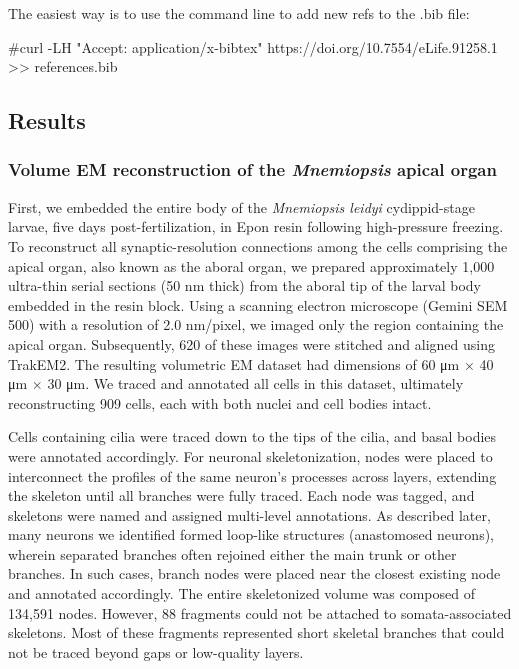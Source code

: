 \documentclass[
  11pt,
]{article}
\newenvironment{Shaded}{\begin{snugshade}}{\end{snugshade}}
\newcommand{\CommentTok}[1]{\textcolor[rgb]{0.37,0.37,0.37}{#1}}
\begin{document}
The easiest way is to use the command line to add new refs to the .bib
file:

\begin{Shaded}
\begin{Highlighting}[]
\CommentTok{\#curl {-}LH "Accept: application/x{-}bibtex" https://doi.org/10.7554/eLife.91258.1 \textgreater{}\textgreater{} references.bib}
\end{Highlighting}
\end{Shaded}

\subsection{Results}\label{results}

\subsubsection{\texorpdfstring{Volume EM reconstruction of the
\emph{Mnemiopsis} apical
organ}{Volume EM reconstruction of the Mnemiopsis apical organ}}\label{volume-em-reconstruction-of-the-mnemiopsis-apical-organ}

First, we embedded the entire body of the \emph{Mnemiopsis leidyi}
cydippid-stage larvae, five days post-fertilization, in Epon resin
following high-pressure freezing. To reconstruct all synaptic-resolution
connections among the cells comprising the apical organ, also known as
the aboral organ, we prepared approximately 1,000 ultra-thin serial
sections (50 nm thick) from the aboral tip of the larval body embedded
in the resin block. Using a scanning electron microscope (Gemini SEM
500) with a resolution of 2.0 nm/pixel, we imaged only the region
containing the apical organ. Subsequently, 620 of these images were
stitched and aligned using TrakEM2. The resulting volumetric EM dataset
had dimensions of 60 μm × 40 μm × 30 μm. We traced and annotated all
cells in this dataset, ultimately reconstructing 909 cells, each with
both nuclei and cell bodies intact.

Cells containing cilia were traced down to the tips of the cilia, and
basal bodies were annotated accordingly. For neuronal skeletonization,
nodes were placed to interconnect the profiles of the same neuron's
processes across layers, extending the skeleton until all branches were
fully traced. Each node was tagged, and skeletons were named and
assigned multi-level annotations. As described later, many neurons we
identified formed loop-like structures (anastomosed neurons), wherein
separated branches often rejoined either the main trunk or other
branches. In such cases, branch nodes were placed near the closest
existing node and annotated accordingly. The entire skeletonized volume
was composed of 134,591 nodes. However, 88 fragments could not be
attached to somata-associated skeletons. Most of these fragments
represented short skeletal branches that could not be traced beyond gaps
or low-quality layers.
\end{document}
